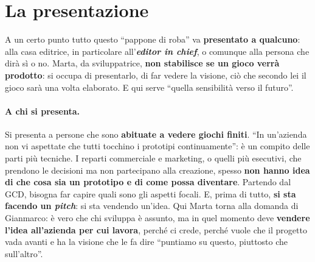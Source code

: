 \section{La presentazione}
\label{a13:sec:presentazione}



A un certo punto tutto questo ``pappone di roba'' va \textbf{presentato a qualcuno}: alla
casa editrice, in particolare all'\textbf{\emph{editor in chief}}, o comunque alla persona
che dirà sì o no. Marta, da sviluppatrice, \textbf{non stabilisce se un gioco verrà
prodotto}: si occupa di presentarlo, di far vedere la visione, ciò che secondo lei il gioco
sarà una volta elaborato. E qui serve ``quella sensibilità verso il futuro''.

\paragraph{A chi si presenta.} Si presenta a persone che sono \textbf{abituate a vedere
giochi finiti}. ``In un'azienda non vi aspettate che tutti tocchino i prototipi
continuamente'': è un compito delle parti più tecniche. I reparti commerciale e marketing,
o quelli più esecutivi, che prendono le decisioni ma non partecipano alla creazione,
spesso \textbf{non hanno idea di che cosa sia un prototipo e di come possa diventare}.
Partendo dal GCD, bisogna far capire quali sono gli aspetti focali. E, prima di tutto,
\textbf{si sta facendo un \emph{pitch}}: si sta vendendo un'idea. Qui Marta torna alla
domanda di Gianmarco: è vero che chi sviluppa è assunto, ma in quel momento deve
\textbf{vendere l'idea all'azienda per cui lavora}, perché ci crede, perché vuole che il
progetto vada avanti e ha la visione che le fa dire ``puntiamo su questo, piuttosto che
sull'altro''.

